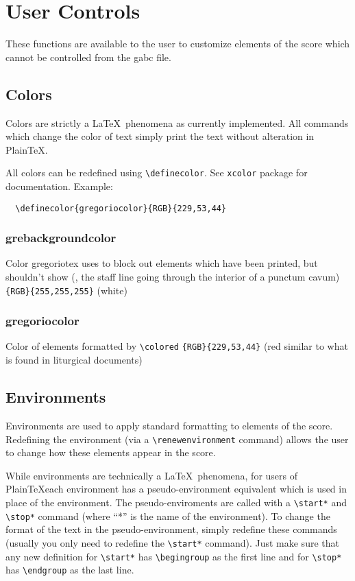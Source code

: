 \section{User Controls}

These functions are available to the user to customize elements of the score which cannot be controlled from the gabc file.

\subsection{Colors}

Colors are strictly a \LaTeX\ phenomena as currently implemented.  All
commands which change the color of text simply print the text without
alteration in Plain\TeX.

All colors can be redefined using \verb=\definecolor=.  See
\verb=xcolor= package for documentation. Example:

\begin{verbatim}
  \definecolor{gregoriocolor}{RGB}{229,53,44}
\end{verbatim}


\subsubsection*{grebackgroundcolor}%
Color gregoriotex uses to block out elements which have been printed,
but shouldn't show (\eg, the staff line going through the interior of
a punctum cavum) \verb={RGB}{255,255,255}= (white)

\subsubsection*{gregoriocolor}
Color of elements formatted by \verb=\colored= \verb={RGB}{229,53,44}=
(red similar to what is found in liturgical documents)


\subsection{Environments}

Environments are used to apply standard formatting to elements of the
score.  Redefining the environment (via a \verb=\renewenvironment=
command) allows the user to change how these elements appear in the
score.

While environments are technically a \LaTeX\ phenomena, for users of
Plain\TeX each environment has a pseudo-environment equivalent which is
used in place of the environment.  The pseudo-enviroments are called
with a \verb=\start*= and \verb=\stop*= command (where ``*'' is the
name of the environment).  To change the format of the text in the
pseudo-environment, simply redefine these commands (usually you only
need to redefine the \verb=\start*= command).  Just make sure that any
new definition for \verb=\start*= has \verb=\begingroup= as the first
line and for \verb=\stop*= has \verb=\endgroup= as the last line.


